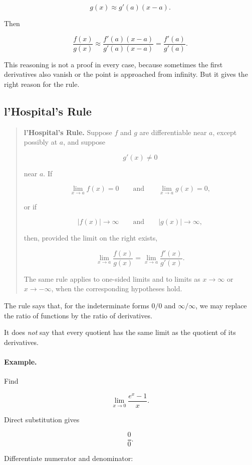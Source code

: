\[
g(x)\approx g'(a)(x-a).
\]

Then

\[
\frac{f(x)}{g(x)}
\approx
\frac{f'(a)(x-a)}{g'(a)(x-a)}
=
\frac{f'(a)}{g'(a)}.
\]

This reasoning is not a proof in every case, because sometimes the first derivatives
also vanish or the point is approached from infinity.  But it gives the right reason for
the rule.

\subsection{l'Hospital's Rule}
\label{subsec:lhospital-statement}

\begin{quote}
\textbf{l'Hospital's Rule.}
Suppose \(f\) and \(g\) are differentiable near \(a\), except possibly at \(a\), and suppose

\[
g'(x)\neq0
\]

near \(a\).  If

\[
\lim_{x\to a}f(x)=0
\qquad\text{and}\qquad
\lim_{x\to a}g(x)=0,
\]

or if

\[
|f(x)|\to\infty
\qquad\text{and}\qquad
|g(x)|\to\infty,
\]

then, provided the limit on the right exists,

\[
\boxed{
\lim_{x\to a}\frac{f(x)}{g(x)}
=
\lim_{x\to a}\frac{f'(x)}{g'(x)}.
}
\]

The same rule applies to one-sided limits and to limits as \(x\to\infty\) or
\(x\to-\infty\), when the corresponding hypotheses hold.
\end{quote}

The rule says that, for the indeterminate forms \(0/0\) and \(\infty/\infty\), we may
replace the ratio of functions by the ratio of derivatives.

It does \emph{not} say that every quotient has the same limit as the quotient of its
derivatives.

\paragraph{Example.}
Find

\[
\lim_{x\to0}\frac{e^x-1}{x}.
\]

Direct substitution gives

\[
\frac{0}{0}.
\]

Differentiate numerator and denominator:

